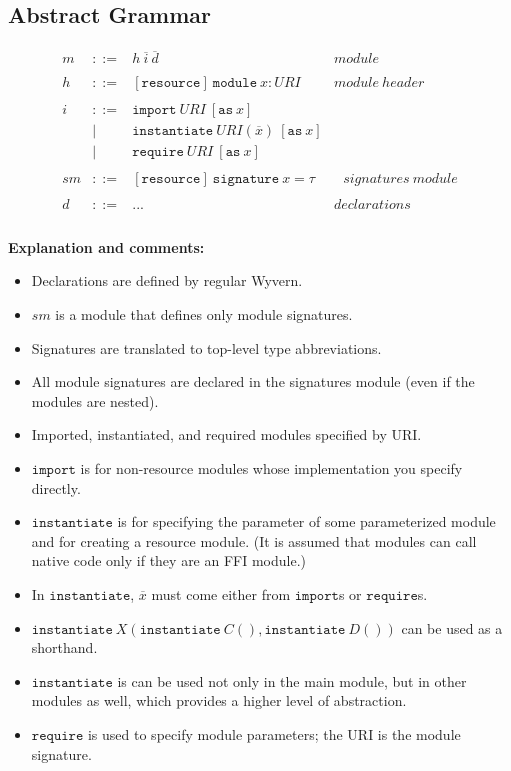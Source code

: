 \documentclass{llncs}
\newcommand{\keywadj}[1]{\mathtt{#1}}
\newcommand{\keyw}[1]{\keywadj{#1}~}
\begin{document}
\newpage

\subsection{Abstract Grammar}
\[
\begin{array}{cllr}
m & ::= & h~\overline{i}~\overline{d} & module \\
&&\\
h & ::= & [\keywadj{resource}]~\keyw{module} x : URI & module~header \\
&&\\
i & ::= & \keyw{import} URI~[\keyw{as} x] \\
  & |   & \keyw{instantiate} URI(\overline{x})~[\keyw{as} x] \\
  & |   & \keyw{require} URI~[\keyw{as} x]\\
&&\\
sm & ::= & [\keywadj{resource}]~\keyw{signature} x = \tau &~~~signatures~module \\
&&\\
d & ::= & ... & declarations \\
&&\\
\end{array}
\]

\noindent\textbf{Explanation and comments:}
\begin{itemize}
\item Declarations are defined by regular Wyvern.
\item $sm$ is a module that defines only module signatures.
\item Signatures are translated to top-level type abbreviations.
\item All module signatures are declared in the signatures module (even if the modules are nested).\item Imported, instantiated, and required modules specified by URI.
\item $\keywadj{import}$ is for non-resource modules whose implementation you specify directly.
\item $\keywadj{instantiate}$ is for specifying the parameter of some parameterized module and for creating a resource module. (It is assumed that modules can call native code only if they are an FFI module.)
\item In $\keywadj{instantiate}$, $\overline{x}$ must come either from $\keywadj{import}$s or $\keywadj{require}$s.
\item $\keyw{instantiate} X(\keyw{instantiate} C(), \keyw{instantiate} D())$ can be used as a shorthand.
\item $\keywadj{instantiate}$ is can be used not only in the main module, but in other modules as well, which provides a higher level of abstraction.
\item $\keywadj{require}$ is used to specify module parameters; the URI is the module signature.

\end{itemize}
\end{document}
